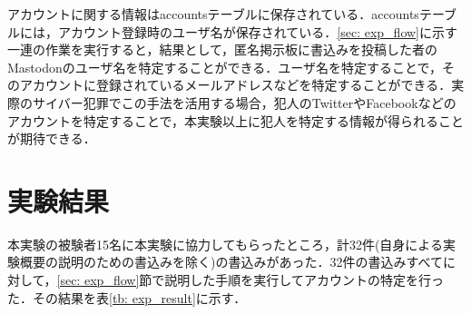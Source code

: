 \documentclass[10pt, a4paper]{jreport}
\begin{document}
アカウントに関する情報はaccountsテーブルに保存されている．accountsテーブルには，アカウント登録時のユーザ名が保存されている．\ref{sec: exp_flow}に示す一連の作業を実行すると，結果として，匿名掲示板に書込みを投稿した者のMastodonのユーザ名を特定することができる．ユーザ名を特定することで，そのアカウントに登録されているメールアドレスなどを特定することができる．実際のサイバー犯罪でこの手法を活用する場合，犯人のTwitterやFacebookなどのアカウントを特定することで，本実験以上に犯人を特定する情報が得られることが期待できる．

\section{実験結果}
本実験の被験者15名に本実験に協力してもらったところ，計32件(自身による実験概要の説明のための書込みを除く)の書込みがあった．32件の書込みすべてに対して，\ref{sec: exp_flow}節で説明した手順を実行してアカウントの特定を行った．その結果を表\ref{tb: exp_result}に示す．
\end{document}

